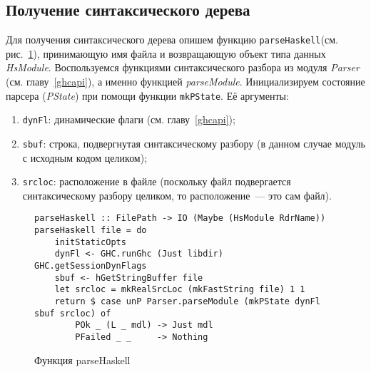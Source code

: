 \subsection{Получение синтаксического дерева}
Для получения синтаксического дерева опишем функцию \lstinline{parseHaskell}(см. рис.~\ref{parser}), принимающую имя файла и возвращающую объект типа данных \textit{HsModule}. Воспользуемся функциями синтаксического разбора из модуля \textit{Parser} (см. главу~\ref{ghcapi}), а именно функцией \textit{parseModule}. Инициализируем состояние парсера (\textit{PState}) при помощи функции \lstinline{mkPState}. Её аргументы:
\begin{enumerate}[1)]
\item \lstinline{dynFl}: динамические флаги (см. главу~\ref{ghcapi});
\item \lstinline{sbuf}: строка, подвергнутая синтаксическому разбору (в данном случае модуль с исходным кодом целиком);
\item \lstinline{srcloc}: расположение в файле (поскольку файл подвергается синтаксическому разбору целиком, то расположение~--- это сам файл).
\end{enumerate}

\begin{figure}[H]
\hrulefill
\begin{lstlisting}
parseHaskell :: FilePath -> IO (Maybe (HsModule RdrName))
parseHaskell file = do
    initStaticOpts
    dynFl <- GHC.runGhc (Just libdir) GHC.getSessionDynFlags
    sbuf <- hGetStringBuffer file
    let srcloc = mkRealSrcLoc (mkFastString file) 1 1
    return $ case unP Parser.parseModule (mkPState dynFl sbuf srcloc) of
        POk _ (L _ mdl) -> Just mdl
        PFailed _ _     -> Nothing
\end{lstlisting}
\hrulefill
\caption{Функция parseHaskell}\label{parser}
\end{figure}
